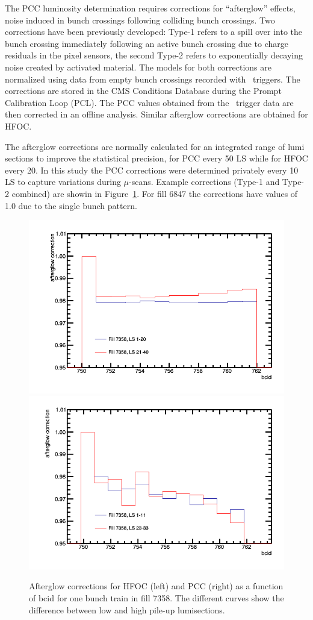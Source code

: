 
The PCC luminosity determination requires corrections for ``afterglow'' effects, noise induced in bunch crossings following colliding bunch crossings.
Two corrections have been previously developed: Type-1 refers to a spill over into the bunch crossing immediately following an active bunch crossing due to charge residuals in the pixel sensors, the second Type-2 refers to exponentially decaying noise created by activated material.
The models for both corrections are normalized using data from empty bunch crossings recorded with \random\ triggers.
The corrections are stored in the CMS Conditions Database during the Prompt Calibration Loop (PCL).
The PCC values obtained from the \zerobias\ trigger data are then corrected in an offline analysis.
Similar afterglow corrections are obtained for HFOC.

The afterglow corrections are normally calculated for an integrated range of lumi sections to improve the statistical precision, for PCC every 50 LS while for HFOC every 20. In this study the PCC corrections were determined privately every 10 LS to capture variations during $\mu$-scans.
Example corrections (Type-1 and Type-2 combined) are showin in Figure~\ref{fig:afterglow}.
For fill 6847 the corrections have values of 1.0 due to the single bunch pattern.

\begin{figure}[t]
  \begin{center}
    \includegraphics[width=0.47\linewidth]{plots/HFAfterglowCorr.png}
    \includegraphics[width=0.47\linewidth]{plots/PCCAfterglowCorr.png}
    \caption{
      Afterglow corrections for HFOC (left) and PCC (right) as a function of bcid for one bunch train in fill 7358.
      The different curves show the difference between low and high pile-up lumisections.
    \label{fig:afterglow}
    }
  \end{center}
\end{figure}

